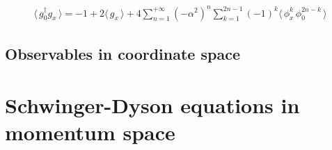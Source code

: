 \documentclass[12pt]{article}
\newcommand{\lr}[1]{ \left( #1 \right) }
\newcommand{\vev}[1]{ \langle \, #1 \, \rangle }
\begin{document}
\begin{eqnarray}
\label{gx_vev_coordinate}
 \vev{g^{\dag}_0 g_x}
 =
 -1 + 2 \vev{g_x}
 +
 4 \sum\limits_{n=1}^{+\infty} \lr{-\alpha^2}^n
 \sum\limits_{k=1}^{2 n - 1} \lr{-1}^k
 \vev{\phi_x^k \, \phi_0^{2n - k}}
\end{eqnarray}


\subsection{Observables in coordinate space}

\section{Schwinger-Dyson equations in momentum space}
\label{sec:sd_momentum}
\end{document}
